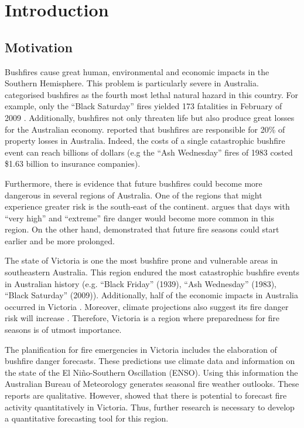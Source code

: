 
\chapter{Introduction}
\newpage{}

\section{Motivation}

Bushfires cause great human, environmental and economic impacts in
the Southern Hemisphere. This problem is particularly severe in Australia.
\citet{Haynes2010} categorised bushfires as the fourth most lethal
natural hazard in this country. For example, only the \textquotedblleft Black
Saturday\textquotedblright{} fires yielded 173 fatalities in February
of 2009 \citep{Teague2010}. Additionally, bushfires not only threaten
life but also produce great losses for the Australian economy. \citet{McAneney2009}
reported that bushfires are responsible for 20\% of property losses
in Australia. Indeed, the costs of a single catastrophic bushfire
event can reach billions of dollars (e.g the ``Ash Wednesday'' fires
of 1983 costed \$1.63 billion to insurance companies).

Furthermore, there is evidence that future bushfires could become
more dangerous in several regions of Australia. One of the regions
that might experience greater risk is the south-east of the continent.
\citet{Lucas2007} argues that days with \textquotedblleft very high\textquotedblright{}
and \textquotedblleft extreme\textquotedblright{} fire danger would
become more common in this region. On the other hand, \citet{Clarke2011}
demonstrated that future fire seasons could start earlier and be more
prolonged. 

The state of Victoria is one the most bushfire prone and vulnerable
areas in southeastern Australia. This region endured the most catastrophic
bushfire events in Australian history (e.g. ``Black Friday'' (1939),
``Ash Wednesday'' (1983), ``Black Saturday'' (2009)). Additionally,
half of the economic impacts in Australia occurred in Victoria \citep{Luke1978}.
Moreover, climate projections also suggest its fire danger risk will
increase \citep{Clarke2011}. Therefore, Victoria is a region where
preparedness for fire seasons is of utmost importance.

The planification for fire emergencies in Victoria includes the elaboration
of bushfire danger forecasts. These predictions use climate data and
information on the state of the El Ni\~no-Southern Oscillation (ENSO).
Using this information the Australian Bureau of Meteorology generates
seasonal fire weather outlooks. These reports are qualitative. However,
\citet{Harris2013} showed that there is potential to forecast fire
activity quantitatively in Victoria. Thus, further research is necessary
to develop a quantitative forecasting tool for this region. 

